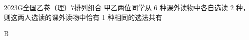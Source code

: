 
\begin{problem}{2023}{G}{全国乙卷（理）}{7}{排列组合}
甲乙两位同学从 6 种课外读物中各自选读 2 种，则这两人选读的课外读物中恰有 1 种相同的选法共有
\begin{choices}
\end{choices}
\end{problem}

\begin{answer}
B
\end{answer}

\begin{solutions}

\end{solutions}